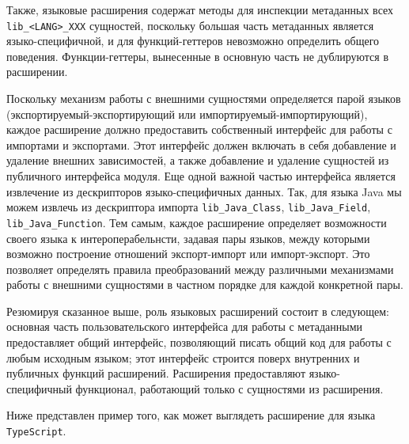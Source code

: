 Также, языковые расширения содержат методы для инспекции метаданных всех \texttt{lib\_<LANG>\_XXX} сущностей, поскольку большая часть метаданных является языко-специфичной, и для функций-геттеров невозможно определить общего поведения. Функции-геттеры, вынесенные в основную часть не дублируются в расширении.

Поскольку механизм работы с внешними сущностями определяется парой языков (экспортируемый-экспортирующий или импортируемый-импортирующий), каждое расширение должно предоставить собственный интерфейс для работы с импортами и экспортами. Этот интерфейс должен включать в себя добавление и удаление внешних зависимостей, а также добавление и удаление сущностей из публичного интерфейса модуля. Еще одной важной частью интерфейса является извлечение из дескрипторов языко-специфичных данных. Так, для языка Java мы можем извлечь из дескриптора импорта \texttt{lib\_Java\_Class}, \texttt{lib\_Java\_Field}, \texttt{lib\_Java\_Function}. Тем самым, каждое расширение определяет возможности своего языка к интероперабельнсти, задавая пары языков, между которыми возможно построение отношений экспорт-импорт или импорт-экспорт. Это позволяет определять правила преобразований между различными механизмами работы с внешними сущностями в частном порядке для каждой конкретной пары.

Резюмируя сказанное выше, роль языковых расширений состоит в следующем: основная часть пользовательского интерфейса для работы с метаданными предоставляет общий интерфейс, позволяющий писать общий код для работы с любым исходным языком; этот интерфейс строится поверх внутренних и публичных функций расширений. Расширения предоставляют языко-специфичный функционал, работающий только с сущностями из расширения.

Ниже представлен пример того, как может выглядеть расширение для языка \texttt{TypeScript}.

